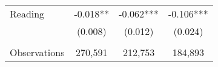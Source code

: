 {\begin{tabular}{lccc}
\hspace{3mm}Reading &      -0.018** &      -0.062***&      -0.106***\\
                    &     (0.008)   &     (0.012)   &     (0.024)   \\
                    &               &               &               \\
\hspace{3mm}Observations&     270,591   &     212,753   &     184,893   \\
 

\bottomrule
\end{tabular}
}
